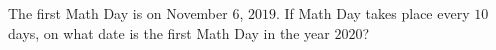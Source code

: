 The first Math Day is on November $6$, $2019$. If Math Day takes place every $10$ days, on what date is the first Math Day in the year $2020$?
